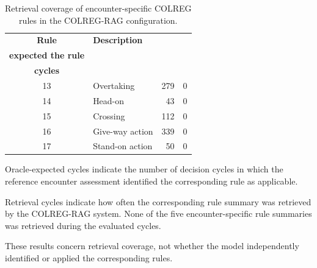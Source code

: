 \documentclass[10pt]{reportMaster}
\begin{document}
\begin{table}[t]
\centering
\caption{Retrieval coverage of encounter-specific COLREG
rules in the COLREG-RAG configuration.}
\label{tab:imazu-encounter-rule-retrieval}
\begin{threeparttable}

\small
\setlength{\tabcolsep}{8pt}
\renewcommand{\arraystretch}{1.15}

\begin{tabular}{@{}c l r r@{}}
\toprule
\textbf{Rule}
& \textbf{Description}
& \shortstack{\textbf{Cycles where oracle}\\
\textbf{expected the rule}}
& \shortstack{\textbf{Retrieval}\\
\textbf{cycles}} \\
\midrule

13 & Overtaking
& 279 & 0 \\

14 & Head-on
& 43 & 0 \\

15 & Crossing
& 112 & 0 \\

16 & Give-way action
& 339 & 0 \\

17 & Stand-on action
& 50 & 0 \\

\bottomrule
\end{tabular}

\begin{tablenotes}[flushleft]
\footnotesize
\item Oracle-expected cycles indicate the number
of decision cycles in which the reference encounter
assessment identified the corresponding rule as
applicable.
\item Retrieval cycles indicate how often the
corresponding rule summary was retrieved by
the COLREG-RAG system. None of the five
encounter-specific rule summaries was retrieved
during the evaluated cycles.
\item These results concern retrieval coverage,
not whether the model independently identified
or applied the corresponding rules.
\end{tablenotes}

\end{threeparttable}
\end{table}
\end{document}
